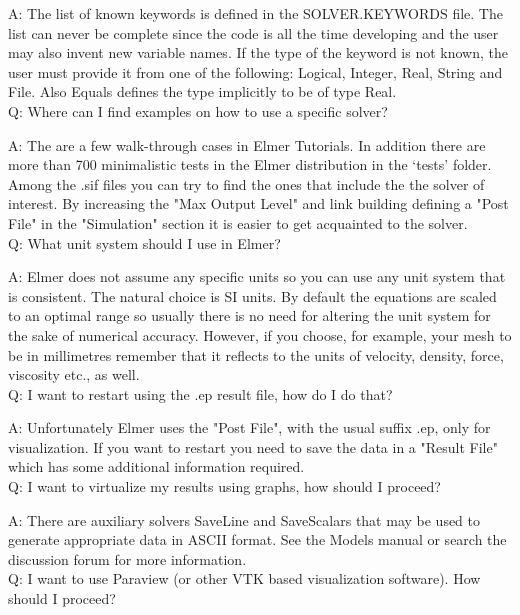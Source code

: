     A: The list of known keywords is defined in the SOLVER.KEYWORDS file. The list can never be complete since the code is all the time developing and the user may also invent new variable names. If the type of the keyword is not known, the user must provide it from one of the following: Logical, Integer, Real, String and File. Also Equals defines the type implicitly to be of type Real.\\

    Q: Where can I find examples on how to use a specific solver?

    A: The are a few walk-through cases in Elmer Tutorials. In addition there are more than 700 minimalistic tests in the Elmer distribution in the `tests' folder.  Among the .sif files you can try to find the ones that include the the solver of interest. By increasing the "Max Output Level" and link building defining a "Post File" in the "Simulation" section it is easier to get acquainted to the solver.\\

    Q: What unit system should I use in Elmer?

    A: Elmer does not assume any specific units so you can use any unit system that is consistent. The natural choice is SI units. By default the equations are scaled to an optimal range so usually there is no need for altering the unit system for the sake of numerical accuracy. However, if you choose, for example, your mesh to be in millimetres remember that it reflects to the units of velocity, density, force, viscosity etc., as well.\\

    Q: I want to restart using the .ep result file, how do I do that?

    A: Unfortunately Elmer uses the "Post File", with the usual suffix .ep, only for visualization. If you want to restart you need to save the data in a "Result File" which has some additional information required.\\

    Q: I want to virtualize my results using graphs, how should I proceed?

    A: There are auxiliary solvers SaveLine and SaveScalars that may be used to generate appropriate data in ASCII format. See the Models manual or search the discussion forum for more information.\\

    Q: I want to use Paraview (or other VTK based visualization software). How should I proceed?

